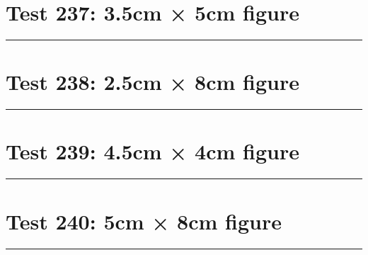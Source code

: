 \documentclass[a4paper,11pt]{article}
\begin{document}
\section*{Test 237: 3.5cm × 5cm figure}
\begin{swarmwrap}%
  \begin{minipage}[t]{3cm}
    \centering
    \rule{\linewidth}{5cm}
  \end{minipage}%
\end{swarmwrap}%
\swarmwrapnext
\lipsum[143]
\lipsum[144]
\lipsum[145]
\lipsum[146]
\lipsum[147]
\lipsum[148]
\section*{Test 238: 2.5cm × 8cm figure}
\begin{swarmwrap}%
  \begin{minipage}[t]{2cm}
    \centering
    \rule{\linewidth}{8cm}
  \end{minipage}%
\end{swarmwrap}%
\swarmwrapnext
\lipsum[132]
\lipsum[133]
\lipsum[134]
\lipsum[135]
\section*{Test 239: 4.5cm × 4cm figure}
\begin{swarmwrap}%
  \begin{minipage}[t]{4cm}
    \centering
    \rule{\linewidth}{4cm}
  \end{minipage}%
\end{swarmwrap}%
\swarmwrapnext
\lipsum[72]
\lipsum[73]
\lipsum[74]
\section*{Test 240: 5cm × 8cm figure}
\begin{swarmwrap}%
  \begin{minipage}[t]{5cm}
    \centering
    \rule{\linewidth}{8cm}
  \end{minipage}%
\end{swarmwrap}%
\swarmwrapnext
\lipsum[131]
\lipsum[132]
\lipsum[133]
\lipsum[134]
\lipsum[135]
\end{document}
